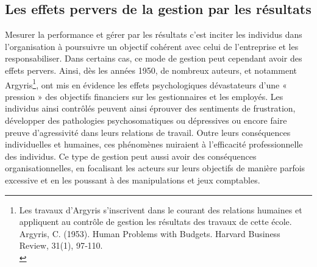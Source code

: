 \documentclass{tufte-handout}
\begin{document}
\subsection{Les effets pervers de la gestion par les résultats}
\label{sec:orgd93b908}
Mesurer la performance et gérer par les résultats c’est inciter les individus dans l’organisation à poursuivre un objectif cohérent avec celui de l’entreprise et les responsabiliser. Dans certains cas, ce mode de gestion peut cependant avoir des effets pervers. Ainsi, dès les années 1950, de nombreux auteurs, et notamment Argyris\footnote{Les travaux d’Argyris s’inscrivent dans le courant des relations humaines et appliquent au contrôle de gestion les résultats des travaux de cette école. Argyris, C. (1953). Human Problems with Budgets. Harvard Business Review, 31(1), 97‑110.\\}, ont mis en évidence les effets psychologiques dévastateurs d’une « pression » des objectifs financiers sur les gestionnaires et les employés. Les individus ainsi contrôlés peuvent ainsi éprouver des sentiments de frustration, développer des pathologies psychosomatiques ou dépressives ou encore faire preuve d’agressivité dans leurs relations de travail. Outre leurs conséquences individuelles et humaines, ces phénomènes nuiraient à l’efficacité professionnelle des individus. Ce type de gestion peut aussi avoir des conséquences organisationnelles, en focalisant les acteurs sur leurs objectifs de manière parfois excessive et en les poussant à des manipulations et jeux comptables.\\
\end{document}
